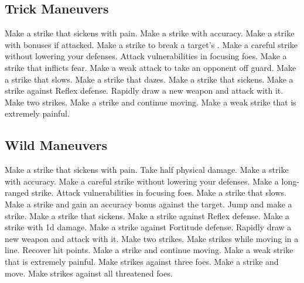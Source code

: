 \subsection{Trick Maneuvers}\label{Trick Maneuvers}
\begin{spelllist}
 Make a strike that sickens with pain.
 Make a strike with  accuracy.
 Make a strike with bonuses if attacked.
 Make a strike to break a target's .
 Make a careful strike without lowering your defenses.
 Attack vulnerabilities in focusing foes.
 Make a strike that inflicts fear.
 Make a weak attack to take an opponent off guard.
 Make a strike that slows.
 Make a strike that dazes.
 Make a strike that sickens.
 Make a strike against Reflex defense.
 Rapidly draw a new weapon and attack with it.
 Make two strikes.
 Make a strike and continue moving.
 Make a weak strike that is extremely painful.
\end{spelllist}



\small
\subsection{Wild Maneuvers}\label{Wild Maneuvers}
\begin{spelllist}
 Make a strike that sickens with pain.
 Take half physical damage.
 Make a strike with  accuracy.
 Make a careful strike without lowering your defenses.
 Make a long-ranged strike.
 Attack vulnerabilities in focusing foes.
 Make a strike that slows.
 Make a strike and gain an accuracy bonus against the target.
 Jump and make a strike.
 Make a strike that sickens.
 Make a strike against Reflex defense.
 Make a strike with \plus1d damage.
 Make a strike against Fortitude defense.
 Rapidly draw a new weapon and attack with it.
 Make two strikes.
 Make strikes while moving in a line.
 Recover hit points.
 Make a strike and continue moving.
 Make a weak strike that is extremely painful.
 Make strikes against three foes.
 Make a strike and move.
 Make strikes against all threatened foes.
\end{spelllist}
